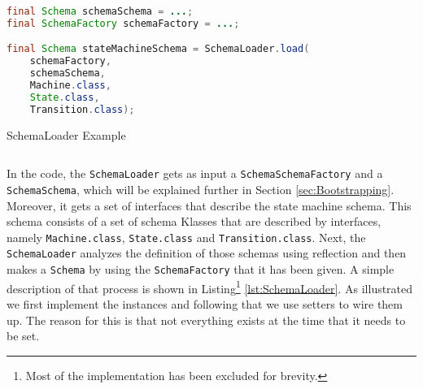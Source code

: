 \begin{sourcecode} [H]
	\begin{lstlisting}[language=Java, escapechar=|]
final Schema schemaSchema = ...;
final SchemaFactory schemaFactory = ...;

final Schema stateMachineSchema = SchemaLoader.load(
	schemaFactory, 
	schemaSchema, 
	Machine.class, 
	State.class, 
	Transition.class);
	\end{lstlisting}
	\caption{SchemaLoader Example}
	\label{lst:SchemaLoader Example}
\end{sourcecode}

In the code, the \texttt{SchemaLoader} gets as input a \texttt{SchemaSchemaFactory} and a \texttt{SchemaSchema}, which will be explained further in Section \ref{sec:Bootstrapping}.
Moreover, it gets a set of interfaces that describe the state machine schema.
This schema consists of a set of schema Klasses that are described by interfaces, namely \texttt{Machine.class}, \texttt{State.class} and \texttt{Transition.class}.
Next, the \texttt{SchemaLoader} analyzes the definition of those schemas using reflection and then makes a \texttt{Schema} by using the \texttt{SchemaFactory} that it has been given.
A simple description of that process is shown in Listing\footnote{
	Most of the implementation has been excluded for brevity.} 
\ref{lst:SchemaLoader}.
As illustrated we first implement the instances and following that we use setters to wire them up. 
The reason for this is that not everything exists at the time that it needs to be set.

